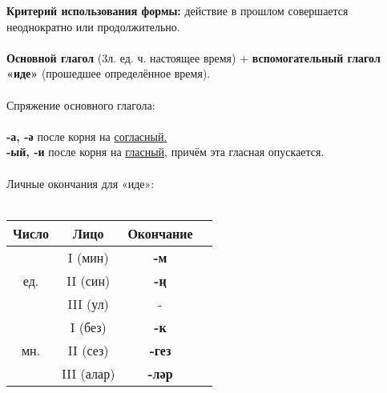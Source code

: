 \textbf{Критерий использования формы:} действие в прошлом совершается неоднократно или продолжительно.\\ \\
\textbf{Основной глагол} (3л. ед. ч. настоящее время) $+$ \textbf{вспомогательный глагол «иде»} (прошедшее определённое время).\\ \\
Спряжение основного глагола:\\\\
\textbf{-а, -ә} после корня на \underline{согласный.}\\
\textbf{-ый, -и} после корня на \underline{гласный}, причём эта гласная опускается.\\\\
Личные окончания для «иде»:\\\\
\begin{tabular}{ |c|c|c|c| } 
\hline
Число & Лицо & Окончание \\
\hline
\multirow{3}{4em}{ед.}
& I (мин) & \textbf{-м} \\  
& II (син) & \textbf{-ң} \\ 
& III (ул) & - \\ 
\hline
\multirow{3}{4em}{мн.}
& I (без) & \textbf{-к} \\  
& II (сез) & \textbf{-гез} \\ 
& III (алар) & \textbf{-ләр} \\ 
\hline
\end{tabular} \\\\